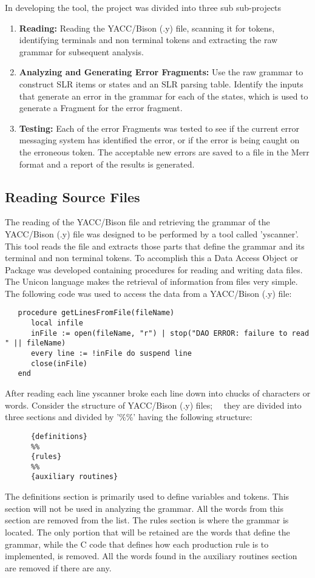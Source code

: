 \documentclass{article}
\begin{document}
In developing the tool, the project was divided into three sub sub-projects
\begin{enumerate}
\item \textbf{Reading:} Reading the YACC/Bison (.y) file, scanning it for tokens, identifying terminals and non terminal tokens and extracting the raw grammar for subsequent analysis.
\item \textbf{Analyzing and Generating Error Fragments:} Use the raw grammar to construct SLR items or states and an SLR parsing table.  Identify the inputs that generate an error in the grammar for each of the states, which is used to generate a Fragment for the error fragment.
\item \textbf{Testing:} Each of the error Fragments was tested to see if the current error messaging system has identified the error, or if the error is being caught on the erroneous token.  The acceptable new errors are saved to a file in the Merr format and a report of the results is generated.
\end{enumerate}

\subsection{Reading Source Files}
The reading of the YACC/Bison file and retrieving the grammar of the YACC/Bison (.y) file was designed to be performed by a tool called 'yscanner'.  This tool reads the file and extracts those parts that define the grammar and its terminal and non terminal tokens.  To accomplish this a Data Access Object or Package was developed containing procedures for reading and writing data files.  The Unicon language makes the retrieval of information from files very simple.  The following code was used to access the data from a YACC/Bison (.y) file:

\linespread{1}
\begin{verbatim}
   procedure getLinesFromFile(fileName)
      local infile
      inFile := open(fileName, "r") | stop("DAO ERROR: failure to read " || fileName)
      every line := !inFile do suspend line
      close(inFile)
   end
\end{verbatim}

After reading each line yscanner broke each line down into chucks of characters or words. Consider the structure of YACC/Bison (.y) files;~\cite{levine}~\cite{louden} they are divided into three sections and divided by '\%\%' having the following structure:
\begin{verbatim}
      {definitions}
      %%
      {rules}
      %%
      {auxiliary routines}
\end{verbatim}
The definitions section is primarily used to define variables and tokens.  This section will not be used in analyzing the grammar.  All the words from this section are removed from the list.  The rules section is where the grammar is located.  The only portion that will be retained are the words that define the grammar, while the C code that defines how each production rule is to implemented, is removed.  All the words found in the auxiliary routines section are removed if there are any. 
\end{document}
